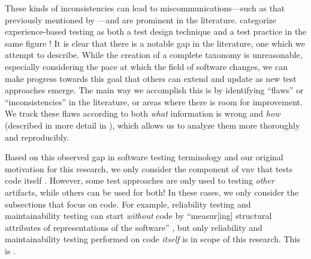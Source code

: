 These kinds of inconsistencies can lead to miscommunications---such as that
previously mentioned by \citet[p.~7]{KanerEtAl2011}---and are prominent in the
literature. %
\citeauthor{IEEE2022} categorize experience-based testing
as both a test design technique and a test practice in the same figure
\citeyearpar[Fig.~2]{IEEE2022}! \tourFlaw{} \loadFlaw{} \alphaFlaw{}
It is clear that there is a notable gap in the literature, one which we
attempt to describe. While the creation of a complete taxonomy is
unreasonable, especially considering the pace at which the field of software
changes, we can make progress towards this goal that others can extend and
update as new test approaches emerge. The main way we accomplish this is by
identifying ``flaws'' or ``inconsistencies'' in the literature, or areas where
there is room for improvement. We track these flaws according to both
\emph{what} information is wrong and \emph{how} (described in more
detail in ), which allows us to analyze them more thoroughly
and reproducibly.

\label{scope-overview}
Based on this observed gap in software testing terminology and our original
motivation for this research, we only consider the component of \acf{vnv} that
tests code itself%
. However, some test approaches are only
used to testing \emph{other} artifacts, while others can be used for both! In
these cases, we only consider the subsections that focus on code. For example,
reliability testing and maintainability testing can start \emph{without} code
by ``measur[ing] structural attributes of representations of the software''
\citep[p.~18]{FentonAndPfleeger1997}, but only reliability and
maintainability testing performed on code \emph{itself} is in scope of this
research. \ifnotpaper This is \highLvlScope{}.
\fi


